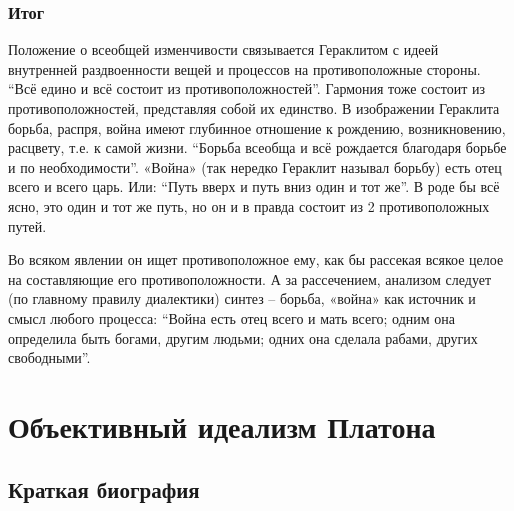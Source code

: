 \documentclass[a4paper, 14pt]{extreport}
\begin{document}
\subsubsection{Итог}

Положение о всеобщей изменчивости связывается Гераклитом с идеей
внутренней раздвоенности вещей и процессов на противоположные стороны.
``Всё едино и всё состоит из противоположностей''. Гармония тоже состоит
из противоположностей, представляя собой их единство. В изображении
Гераклита борьба, распря, война имеют глубинное отношение к рождению,
возникновению, расцвету, т.е. к самой жизни. ``Борьба всеобща и всё
рождается благодаря борьбе и по необходимости''. «Война» (так нередко
Гераклит называл борьбу) есть отец всего и всего царь. Или: ``Путь вверх
и путь вниз один и тот же''. В роде бы всё ясно, это один и тот же путь,
но он и в правда состоит из 2 противоположных путей.

Во всяком явлении он ищет противоположное ему, как бы рассекая всякое
целое на составляющие его противоположности. А за рассечением, анализом
следует (по главному правилу диалектики) синтез -- борьба, «война» как
источник и смысл любого процесса: ``Война есть отец всего и мать всего;
одним она определила быть богами, другим людьми; одних она сделала
рабами, других свободными''.

\section{Объективный идеализм Платона}

\subsection{Краткая биография}
\end{document}
